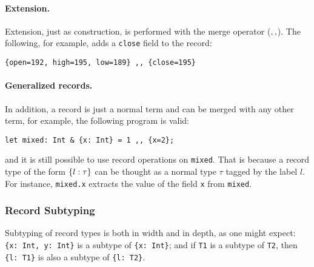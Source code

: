 \paragraph{Extension.}
Extension, just as construction, is performed with the merge operator
($ ,, $). The following, for example, adds a \lstinline{close}
field to the record:
\begin{lstlisting}
{open=192, high=195, low=189} ,, {close=195}
\end{lstlisting}

\paragraph{Generalized records.}
In addition, a record is just a normal term and can be merged with any other
term, for example, the following program is valid:
\begin{lstlisting}
let mixed: Int & {x: Int} = 1 ,, {x=2};
\end{lstlisting}
and it is still possible to use record operations on
\lstinline{mixed}. That is because a record type of the form $ \{ l : \tau \} $ can be thought as a normal type $ \tau $ tagged by the label
$ l $. For instance, \lstinline$mixed.x$ extracts the value of the field
\lstinline{x} from \lstinline{mixed}.

\subsubsection{Record Subtyping}

Subtyping of record types is both in width and in depth, as one might
expect: \lstinline${x: Int, y: Int}$ is a subtype of
\lstinline${x: Int}$; and if \lstinline$T1$ is a subtype of
\lstinline$T2$, then \lstinline${l: T1}$ is also a subtype of
\lstinline${l: T2}$.



